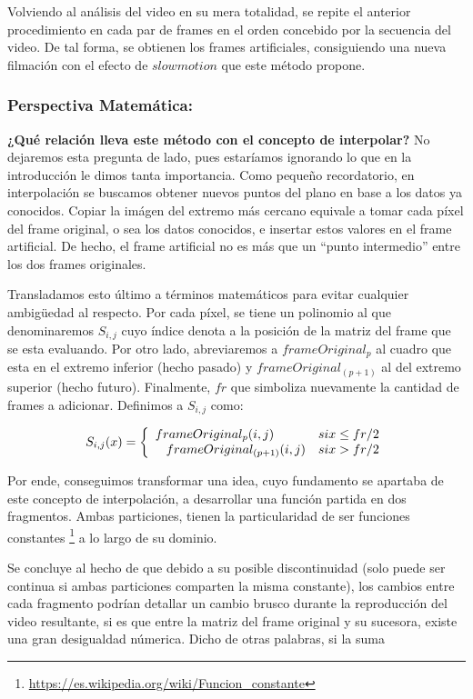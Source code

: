 Volviendo al an\'alisis del video en su mera totalidad, se repite el anterior procedimiento en cada par de frames en el orden concebido por la secuencia del video. De tal forma, se obtienen los frames artificiales, consiguiendo una nueva filmaci\'on con el efecto de $slowmotion$ que este m\'etodo propone. 

\subsubsection*{\bf{Perspectiva Matem\'atica:}}

\textbf{¿Qu\'e relaci\'on lleva este m\'etodo con el concepto de interpolar?} No dejaremos esta pregunta de lado, pues estar\'iamos ignorando lo que en la introducci\'on le dimos tanta importancia. Como pequeño recordatorio, en interpolaci\'on se buscamos obtener nuevos puntos del plano en base a los datos ya conocidos. Copiar la im\'agen del extremo m\'as cercano equivale a tomar cada p\'ixel del frame original, o sea los datos conocidos, e insertar estos valores en el frame artificial. De hecho, el frame artificial no es m\'as que un ``punto intermedio'' entre los dos frames originales.

Transladamos esto \'ultimo a t\'erminos matem\'aticos para evitar cualquier ambigüedad al respecto. Por cada p\'ixel, se tiene un polinomio al que denominaremos $S_{i,j}$ cuyo \'indice denota a la posici\'on de la matriz del frame que se esta evaluando. Por otro lado, abreviaremos a $frameOriginal_{p}$ al cuadro que esta en el extremo inferior (hecho pasado) y $frameOriginal_{(p+1)}$ al del extremo superior (hecho futuro). Finalmente, $fr$ que simboliza nuevamente la cantidad de frames a adicionar. Definimos a $S_{i,j}$ como:

\[
S_{i,j}(x) = 
\left\{
    \begin{array}{ll}
        frameOriginal_{p}(i,j) & \mbox{si } x \leq fr/2 \\
        \hspace{0.3cm}     
        frameOriginal_{(p+1)}(i,j) & \mbox{si } x > fr/2
    \end{array}
\right.
\]

Por ende, conseguimos transformar una idea, cuyo fundamento se apartaba de este concepto de interpolaci\'on, a desarrollar una funci\'on partida en dos fragmentos. Ambas particiones, tienen la particularidad de ser funciones constantes \footnote{\url{https://es.wikipedia.org/wiki/Funcion_constante}} a lo largo de su dominio. 

Se concluye al hecho de que debido a su posible discontinuidad (solo puede ser continua si ambas particiones comparten la misma constante), los cambios entre cada fragmento podr\'ian detallar un cambio brusco durante la reproducci\'on del video resultante, si es que entre la matriz del frame original y su sucesora, existe una gran desigualdad n\'umerica. Dicho de otras palabras, si la suma 

